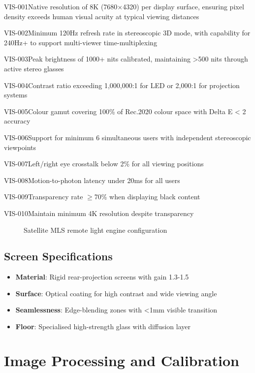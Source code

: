 \begin{requirement}{VIS-001}{Native resolution of 8K (7680×4320) per display surface, ensuring pixel density exceeds human visual acuity at typical viewing distances}
\begin{requirement}{VIS-002}{Minimum 120Hz refresh rate in stereoscopic 3D mode, with capability for 240Hz+ to support multi-viewer time-multiplexing}
\begin{requirement}{VIS-003}{Peak brightness of 1000+ nits calibrated, maintaining >500 nits through active stereo glasses}
\begin{requirement}{VIS-004}{Contrast ratio exceeding 1,000,000:1 for LED or 2,000:1 for projection systems}
\begin{requirement}{VIS-005}{Colour gamut covering 100\% of Rec.2020 colour space with Delta E < 2 accuracy}
\begin{requirement}{VIS-006}{Support for minimum 6 simultaneous users with independent stereoscopic viewpoints}
\begin{requirement}{VIS-007}{Left/right eye crosstalk below 2\% for all viewing positions}
\begin{requirement}{VIS-008}{Motion-to-photon latency under 20ms for all users}
\begin{requirement}{VIS-009}{Transparency rate $\ge$70\% when displaying black content}
\begin{requirement}{VIS-010}{Maintain minimum 4K resolution despite transparency}
\begin{figure}[H]
\caption{Satellite MLS remote light engine configuration}
\end{figure}

\subsection{Screen Specifications}

\begin{itemize}
    \item \textbf{Material}: Rigid rear-projection screens with gain 1.3-1.5
    \item \textbf{Surface}: Optical coating for high contrast and wide viewing angle
    \item \textbf{Seamlessness}: Edge-blending zones with <1mm visible transition
    \item \textbf{Floor}: Specialised high-strength glass with diffusion layer
\end{itemize}

\section{Image Processing and Calibration}


\end{requirement}
\end{requirement}
\end{requirement}
\end{requirement}
\end{requirement}
\end{requirement}
\end{requirement}
\end{requirement}
\end{requirement}
\end{requirement}
